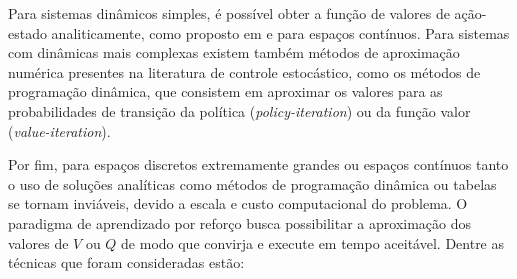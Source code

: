 Para sistemas dinâmicos simples, é possível obter a função de valores de ação-estado analiticamente, como proposto em \citep{Avellaneda2008} e \citep{rao2020stochastic} para espaços contínuos. Para sistemas com dinâmicas mais complexas existem também métodos de aproximação numérica presentes na literatura de controle estocástico, como os métodos de programação dinâmica, que consistem em aproximar os valores para as probabilidades de transição da política (\textit{policy-iteration}) ou da função valor (\textit{value-iteration}).

Por fim, para espaços discretos extremamente grandes ou espaços contínuos tanto o uso de soluções analíticas como métodos de programação dinâmica ou tabelas se tornam inviáveis, devido a escala e custo computacional do problema. O paradigma de aprendizado por reforço busca possibilitar a aproximação dos valores de $V$ ou $Q$ de modo que convirja e execute em tempo aceitável.  Dentre as técnicas que foram consideradas estão:
